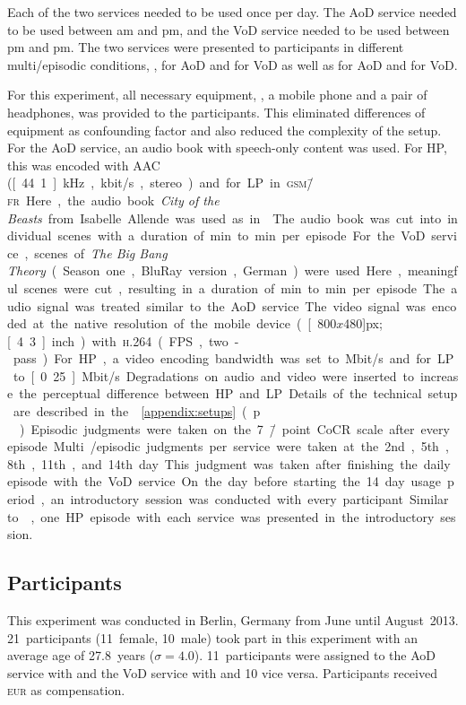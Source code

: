 Each of the two services needed to be used once per day.
The \ac{AoD} service needed to be used between \unit[7]{am} and \unit[1]{pm}, and the \ac{VoD} service needed to be used between \unit[5]{pm} and \unit[11]{pm}.
The two services were presented to participants in different multi\-/episodic conditions, \ie,  for \ac{AoD} and \CX{} for \ac{VoD} as well as \CX{} for \ac{AoD} and  for \ac{VoD}.

For this experiment, all necessary equipment, \ie, a mobile phone and a pair of headphones, was provided to the participants.
This eliminated differences of equipment as confounding factor and also reduced the complexity of the setup.
For the \ac{AoD} service, an audio book with speech-only content was used.
For \ac{HP}, this was encoded with \acs{AAC} (\unit[44.1]{kHz}, \unit[320]{kbit/s}, stereo) and for \ac{LP} in \textsc{\lowercase{GSM\=/FR}}.
Here, the audio book \emph{City of the Beasts} from Isabelle Allende was used as in . 
The audio book was cut into individual scenes with a duration of \unit[12]{min} to \unit[17]{min} per episode.
For the \ac{VoD} service, scenes of \emph{The Big Bang Theory} (Season one, BluRay version, German) were used.
Here, meaningful scenes were cut, resulting in a duration of \unit[8]{min} to \unit[12]{min} per episode.
The audio signal was treated similar to the \ac{AoD} service.
The video signal was encoded at the native resolution of the mobile device (\unit[800$x$480]{px}; \unit[4.3]{inch}) with \textsc{\lowercase{H.264}} (\unit[25]{\acs{FPS}}, two-pass).
For \ac{HP}, a video encoding bandwidth was set to \unit[3]{Mbit/s} and for \ac{LP} to \unit[0.25]{Mbit/s}.
Degradations on audio and video were inserted to increase the perceptual difference between \ac{HP} and \ac{LP}.
Details of the technical setup are described in the \appendix{}~\ref{appendix:setups} (p.\,\pageref{appendix:setups}).

Episodic judgments were taken on the 7\=/point \ac{CoCR} scale after every episode.
Multi\-/episodic judgments per service were taken at the 2nd, 5th, 8th, 11th, and 14th~day.
This judgment was taken after finishing the daily episode with the \ac{VoD} service.

On the day before starting the 14~day usage period, an introductory session was conducted with every participant.
Similar to , one \ac{HP} episode with each service was presented in the introductory session.

\subsection{Participants}
This experiment was conducted in Berlin, Germany from June until August~2013.
21~participants (11~female, 10~male) took part in this experiment with an average age of 27.8~years ($\sigma = 4.0$).
11~participants were assigned to the \ac{AoD} service with  and the \ac{VoD} service with \CX{} and 10 vice versa.
Participants received \unit[40]{\textsc{\lowercase{EUR}}} as compensation.

